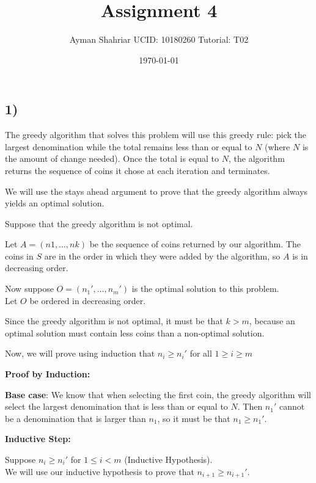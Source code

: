 \documentclass{article}
\title{Assignment 4}
\author{Ayman Shahriar \;\; UCID: 10180260 \;\;  Tutorial: T02 }
\date{\today}
\begin{document}
\maketitle

\raggedright
\setlength{\parskip}{0.8em}  %


\subsection*{1)}

The greedy algorithm that solves this problem will use this greedy rule: pick the largest denomination while the total remains less than or equal to $N$ (where $N$ is the amount of change needed). Once the total is equal to $N$, the algorithm returns the sequence of coins it chose at each iteration and terminates. 

We will use the stays ahead argument to prove that the greedy algorithm always yields an optimal solution.

Suppose that the greedy algorithm is not optimal.

Let $A = (n1, \dotsc, nk)$ be the sequence of coins returned by our algorithm. The coins in $S$ are in the order in which they were added by the algorithm, so $A$ is in decreasing order.

Now suppose $O = (n_1', \dotsc, n_m')$ is the optimal solution to this problem.\\ Let $O$ be ordered in decreasing order.

Since the greedy algorithm is not optimal, it must be that $k > m$, because an optimal solution must contain less coins than a non-optimal solution.

Now, we will prove using induction that $n_i \geq n_i'$ for all $1 \geq i \geq m$

\textbf{Proof by Induction:}

\textbf{Base case}: We know that when selecting the first coin, the greedy algorithm will select the largest denomination that is less than or equal to $N$. Then $n_1'$ cannot be a denomination that is larger than $n_1$, so it must be that $n_1 \geq n_1'$.

\textbf{Inductive Step:}

Suppose $n_i \geq n_i'$ for $1 \leq i < m$ (Inductive Hypothesis).\\
We will use our inductive hypothesis to prove that $n_{i+1} \geq n_{i+1}'$.
\end{document}

